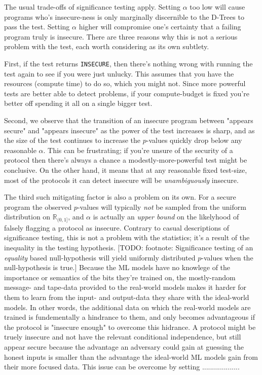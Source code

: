 \documentclass[conference]{IEEEtran}
\begin{document}
The usual trade-offs of significance testing apply.
Setting $\alpha$ too low will cause programs who's insecure-ness is only marginally discernible to the D-Trees
to pass the test.
Setting $\alpha$ higher will compromise one's certainty that a failing program truly is insecure.
There are three reasons why this is not a serious problem with the test, each worth considering as its own subtlety.

First, if the test returns \texttt{INSECURE},
then there's nothing wrong with running the test again to see if you were just unlucky.
This assumes that you have the resources (\eg compute time) to do so, which you might not.
Since more powerful tests are better able to detect problems,
if your compute-budget is fixed you're better off spending it all on a single bigger test.

Second, we observe that the transition of an insecure program between "appears secure" and "appears insecure"
as the power of the test increases is sharp,
and as the size of the test continues to increase the $p$-values quickly drop below any reasonable $\alpha$.
This can be frustrating; if you're unsure of the security of a protocol
then there's always a chance a modestly-more-powerful test might be conclusive.
On the other hand, it means that at any reasonable fixed test-size,
most of the protocols it can detect insecure will be \textit{unambiguously} insecure.

The third such mitigating factor is also a problem on its own.
For a secure program the observed $p$-values
will typically \textit{not} be sampled from the uniform distribution on $\mathbb{R}_{(0,1]}$,
and $\alpha$ is actually an \textit{upper bound} on the likelyhood of falsely flagging a protocol as insecure.
Contrary to casual descriptions of significance testing, this is not a problem with the statistics;
it's a result of the inequality in the testing hypothesis.
[TODO: footnote: Significance testing of an \textit{equality} based null-hypothesis will yield uniformly distributed $p$-values
when the null-hypothesis is true.]
Because the ML models have no knowlege of the importance or semantics of the bits they're trained on,
the mostly-random message- and tape-data provided to the real-world models makes it harder for them
to learn from the input- and output-data they share with the ideal-world models.
In other words, the additional data on which the real-world models are trained is fundementally a hindrance to them,
and only becomes advantageous if the protocol is "insecure enough" to overcome this hidrance.
A protocol might be truely insecure and not have the relevant conditional independence,
but still appear secure because the advantage an adversary could gain at guessing the honest inputs
is smaller than the advantage the ideal-world ML models gain from their more focused data.
This issue can be overcome by setting ...................
\end{document}

